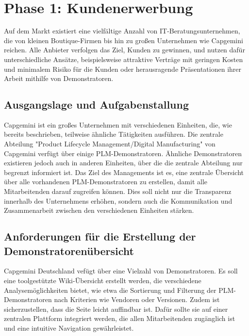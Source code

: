 \chapter{Phase 1: Kundenerwerbung} 
Auf dem Markt existiert eine vielfältige Anzahl von IT-Beratungsunternehmen, die von kleinen Boutique-Firmen bis hin zu großen Unternehmen wie Capgemini reichen. Alle Anbieter verfolgen das Ziel, Kunden zu gewinnen, und nutzen dafür unterschiedliche Ansätze, beispielsweise attraktive Verträge mit geringen Kosten und minimalem Risiko für die Kunden oder herausragende Präsentationen ihrer Arbeit mithilfe von Demonstratoren\cite{muhonen2013qualification}.
\section{Ausgangslage und Aufgabenstallung} %
Capgemini ist ein großes Unternehmen mit verschiedenen Einheiten, die, wie bereits beschrieben, teilweise ähnliche Tätigkeiten ausführen. Die zentrale Abteilung "Product Lifecycle Management/Digital Manufacturing" von Capgemini \cite{Capgemini} verfügt über einige PLM-Demonstratoren. Ähnliche Demonstratoren existieren jedoch auch in anderen Einheiten, über die die zentrale Abteilung nur begrenzt informiert ist.\newline
Das Ziel des Managements ist es, eine zentrale Übersicht über alle vorhandenen PLM-Demonstratoren zu erstellen, damit alle Mitarbeitenden darauf zugreifen können. Dies soll nicht nur die Transparenz innerhalb des Unternehmens erhöhen, sondern auch die Kommunikation und Zusammenarbeit zwischen den verschiedenen Einheiten stärken.
\section{Anforderungen für die Erstellung der Demonstratorenübersicht} %
Capgemini Deutschland vefügt über eine Vielzahl von Demonstratoren. Es soll eine toolgestützte Wiki-Übersicht erstellt werden, die verschiedene Analysemöglichkeiten bietet, wie etwa die Sortierung und Filterung der PLM-Demonstratoren nach Kriterien wie Vendoren oder Versionen.
Zudem ist sicherzustellen, dass die Seite leicht auffindbar ist. Dafür sollte sie auf einer zentralen Plattform integriert werden, die allen Mitarbeitenden zugänglich ist und eine intuitive Navigation gewährleistet.
